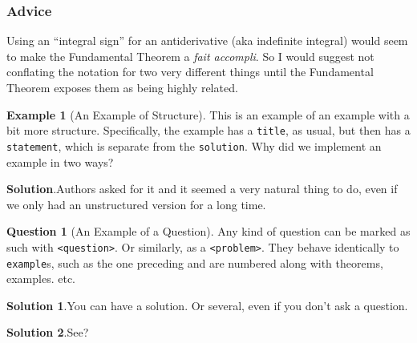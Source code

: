 \documentclass{amsart}
\theoremstyle{plain}%
\theoremstyle{definition}%
\newtheorem{question}[theorem]{Question}
\newtheorem{example}[theorem]{Example}
\theoremstyle{remark}%
\newcommand{\blocktitlefont}{\relax}
\newcommand{\mono}[1]{\texttt{#1}}
\numberwithin{equation}{section}
\begin{document}
\subsubsection{Advice}\label{section-interesting-corollary-5-3}%
Using an ``integral sign'' for an antiderivative (aka indefinite integral) would seem to make the Fundamental Theorem a \textit{fait accompli}.  So I would suggest not conflating the notation for two very different things until the Fundamental Theorem exposes them as being highly related.%
\begin{example}[An Example of Structure]\label{example-structured}%
%
This is an example of an example with a bit more structure.  Specifically, the example has a \mono{title}, as usual, but then has a \mono{statement}, which is separate from the \mono{solution}.  Why did we implement an example in two ways?%
\par\smallskip%
\noindent\textbf{\blocktitlefont Solution}.\hypertarget{example-structured-3}{}\quad{}Authors asked for it and it seemed a very natural thing to do, even if we only had an unstructured version for a long time.%
\end{example}
\begin{question}[An Example of a Question]\label{sample-question}%
%
Any kind of question can be marked as such with \mono{<question>}.  Or similarly, as a \mono{<problem>}.  They behave identically to \mono{example}s, such as the one preceding and are numbered along with theorems, examples. etc.%
\par\smallskip%
\noindent\textbf{\blocktitlefont Solution 1}.\hypertarget{sample-question-3}{}\quad{}You can have a solution. Or several, even if you don't ask a question.%
\par\smallskip%
\noindent\textbf{\blocktitlefont Solution 2}.\hypertarget{sample-question-4}{}\quad{}See?%
\end{question}
\end{document}
